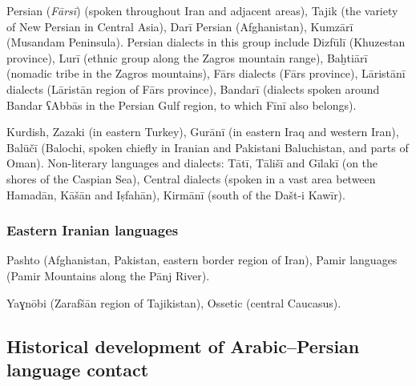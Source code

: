 \documentclass[output=paper]{langsci/langscibook}
\begin{document}
Persian (\textit{Fārsī}) (spoken throughout Iran and adjacent areas), Tajik (the variety of New Persian in Central Asia), Darī Persian (Afghanistan), Kumzārī (Musandam Peninsula). Persian dialects in this group include Dizfūlī (Khuzestan province), Lurī (ethnic group along the Zagros mountain range), Baḫtiārī (nomadic tribe in the Zagros mountains), Fārs dialects (Fārs province), Lāristānī dialects (Lāristān region of Fārs province), Bandarī (dialects spoken around Bandar ʕAbbās in the Persian Gulf region, to which Fīnī also belongs).



Kurdish, Zazaki (in eastern Turkey), Gurānī (in eastern Iraq and western Iran), Balūčī (Balochi, spoken chiefly in Iranian and Pakistani Baluchistan, and parts of Oman). Non-literary languages and dialects: Tātī, Tālišī and Gīlakī (on the shores of the Caspian Sea), Central dialects (spoken in a vast area between Hamadān, Kāšān and Iṣfahān), Kirmānī (south of the Dašt-i Kawīr).



\subsubsection{Eastern Iranian languages}

Pashto (Afghanistan, Pakistan, eastern border region of Iran), Pamir languages (Pamir Mountains along the Pānj River).

Yaɣnōbi (Zarafšān region of Tajikistan), Ossetic (central Caucasus).

\subsection{Historical development of Arabic–Persian language contact} %
\end{document}
